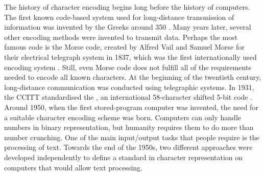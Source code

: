\documentclass[a4paper, 12pt]{scrartcl} %
\begin{document}
The history of character encoding begins long before the history of computers.
The first known code-based system used for long-distance transmission of
information was invented by the Greeks around 350 {}.
Many years later, several other encoding methods were invented to transmit
data. Perhaps the most famous code is the Morse code, created by Alfred Vail
and Samuel Morse for their electrical telegraph system in 1837, which was the
first internationally used encoding system \cite{haralambous2007fonts}. Still,
even Morse code does not fulfill all of the requirements needed to encode all
known characters. At the beginning of the twentieth century, long-distance
communication was conducted using telegraphic systems. In 1931, the \gls{CCITT}
standardised the , an international 58-character
shifted 5-bit code \cite{haralambous2007fonts}. \\
Around 1950, when the first stored-program computer was invented, the need for
a suitable character encoding scheme was born. Computers can only handle
numbers in binary representation, but humanity requires them to do more than
number crunching. One of the main input/output tasks that people require is
the processing of text. Towards the end of the 1950s, two different approaches
were developed independently to define a standard in character representation
on computers that would allow text processing.
\end{document}

